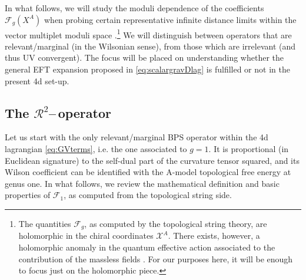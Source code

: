 In what follows, we will study the moduli dependence of the coefficients $\mathcal{F}_g(X^A)$ when probing certain representative infinite distance limits within the vector multiplet moduli space \cite{Lee:2019wij}.\footnote{The quantities $\mathcal{F}_g$, as computed by the topological string theory, are holomorphic in the chiral coordinates $\mathcal{X}^A$. There exists, however, a holomorphic anomaly in the quantum effective action associated to the contribution of the massless fields \cite{Bershadsky:1993cx}. For our purposes here, it will be enough to focus just on the holomorphic piece.} We will distinguish between operators that are relevant/marginal (in the Wilsonian sense), from those which are irrelevant (and thus UV convergent). The focus will be placed on understanding whether the general EFT expansion proposed in \eqref{eq:scalargravDlag} is fulfilled or not in the present 4d set-up.

\subsection{The $\mathcal{R}^2$--\,operator}
\label{ss:threshold4d}

Let us start with the only relevant/marginal BPS operator within the 4d lagrangian \eqref{eq:GVterms}, i.e. the one associated to $g=1$. It is proportional (in Euclidean signature) to the self-dual part of the curvature tensor squared, and its Wilson coefficient can be identified with the A-model topological free energy at genus one. In what follows, we review the mathematical definition and basic properties of $\mathcal{F}_1$, as computed from the topological string side.

